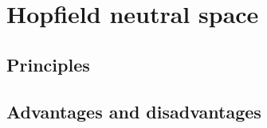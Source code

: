 \chapter{Hopfield neutral space}
\label{cha:hopfield}

\section{Principles}
\label{sec:hopfield_Principles}

\section{Advantages and disadvantages}
\label{sec:hopfield_advanddisadv}

